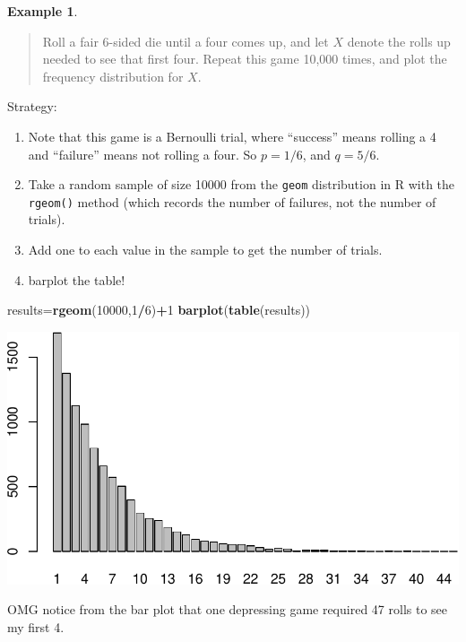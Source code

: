 \documentclass[
]{book}
\newenvironment{Shaded}{\begin{snugshade}}{\end{snugshade}}
\newcommand{\DecValTok}[1]{\textcolor[rgb]{0.00,0.00,0.81}{#1}}
\newcommand{\FunctionTok}[1]{\textcolor[rgb]{0.13,0.29,0.53}{\textbf{#1}}}
\newcommand{\NormalTok}[1]{#1}
\newcommand{\OtherTok}[1]{\textcolor[rgb]{0.56,0.35,0.01}{#1}}
\newcommand{\SpecialCharTok}[1]{\textcolor[rgb]{0.81,0.36,0.00}{\textbf{#1}}}
\providecommand{\tightlist}{%
  \setlength{\itemsep}{0pt}\setlength{\parskip}{0pt}}
\theoremstyle{definition}
\theoremstyle{definition}
\newtheorem{example}{Example}[chapter]
\theoremstyle{definition}
\theoremstyle{definition}
\theoremstyle{remark}
\begin{document}
\begin{example}
\protect\hypertarget{exm:roll-until-4-R}{}\label{exm:roll-until-4-R}\leavevmode

\begin{quote}
Roll a fair 6-sided die until a four comes up, and let \(X\) denote the rolls up needed to see that first four. Repeat this game 10,000 times, and plot the frequency distribution for \(X\).
\end{quote}

Strategy:

\begin{enumerate}
\def\labelenumi{\arabic{enumi}.}
\tightlist
\item
  Note that this game is a Bernoulli trial, where ``success'' means rolling a 4 and ``failure'' means not rolling a four. So \(p = 1/6\), and \(q = 5/6\).\\
\item
  Take a random sample of size 10000 from the \texttt{geom} distribution in R with the \texttt{rgeom()} method (which records the number of failures, not the number of trials).
\item
  Add one to each value in the sample to get the number of trials.
\item
  barplot the table!
\end{enumerate}

\begin{Shaded}
\begin{Highlighting}[]
\NormalTok{results}\OtherTok{=}\FunctionTok{rgeom}\NormalTok{(}\DecValTok{10000}\NormalTok{,}\DecValTok{1}\SpecialCharTok{/}\DecValTok{6}\NormalTok{)}\SpecialCharTok{+}\DecValTok{1}
\FunctionTok{barplot}\NormalTok{(}\FunctionTok{table}\NormalTok{(results))}
\end{Highlighting}
\end{Shaded}

\includegraphics{math340-notes_files/figure-latex/unnamed-chunk-141-1.pdf}

OMG notice from the bar plot that one depressing game required 47 rolls to see my first 4.

\end{example}
\end{document}
